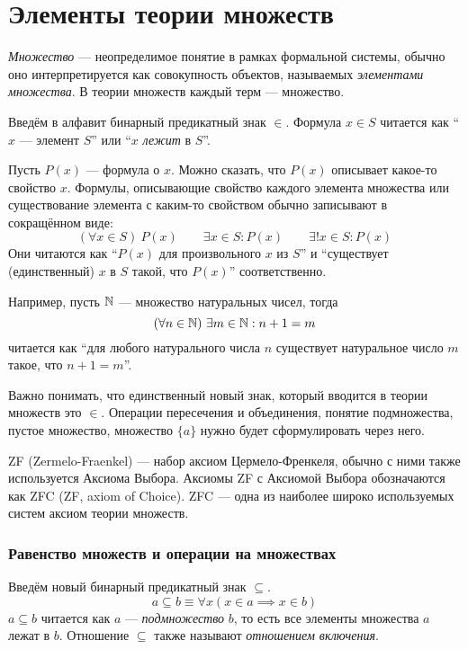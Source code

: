 \part{Элементы теории множеств}

{\it Множество} --- неопределимое понятие в рамках формальной системы,
обычно оно интерпретируется как совокупность объектов,
называемых {\it элементами множества}.
В теории множеств каждый терм --- множество.

Введём в алфавит бинарный предикатный знак $\in$. Формула ${x\in S}$ читается
как ``$x$ --- элемент $S$'' или ``$x$ {\it лежит}
 в $S$''.

Пусть $P(x)$ --- формула о $x$. Можно сказать, что $P(x)$ описывает какое-то
свойство $x$.
Формулы, описывающие свойство каждого элемента множества или
существование элемента с каким-то свойством обычно записывают в сокращённом виде:
\[
	(\forall x\in S)~P(x)\qquad
	\exists x\in S:P(x)\qquad \exists!x\in S:P(x)
\]
Они читаются как ``$P(x)$ для произвольного $x$ из $S$'' и
``существует (единственный) $x$ в $S$ такой, что $P(x)$'' соответственно.

Например, пусть $\mathbb N$ --- множество натуральных чисел, тогда
\[
	(\forall n\in\mathbb N)~\exists m\in\mathbb N:n+1=m
\]
читается как ``для любого натурального числа $n$ существует натуральное число
$m$ такое, что $n+1=m$''.

Важно понимать, что единственный новый знак, который вводится в теории множеств
это $\in$. Операции пересечения и объединения, понятие подмножества, пустое множество,
множество $\{a\}$ нужно будет сформулировать через него.

ZF (Zermelo-Fraenkel) --- набор аксиом
Цермело-Френкеля, обычно с ними также
используется Аксиома Выбора. Аксиомы ZF с Аксиомой Выбора
обозначаются как ZFC (ZF, axiom of Choice).
ZFC --- одна из наиболее широко используемых систем аксиом теории множеств.

\section{Равенство множеств и операции на множествах}

Введём новый бинарный предикатный знак $\subseteq$.
\[
	a\subseteq b\equiv \forall x(x\in a\implies x\in b)
\]
${a\subseteq b}$ читается как $a$ --- {\it подмножество}
 $b$, то есть все
элементы множества $a$ лежат в $b$. Отношение $\subseteq$ также называют
{\it отношением включения}.

